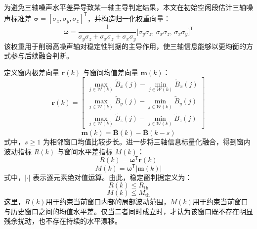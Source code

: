 \documentclass{xdupgthesis}
\begin{document}
为避免三轴噪声水平差异导致某一轴主导判定结果，本文在初始空闲段估计三轴噪声标准差 $\boldsymbol{\sigma}=[\sigma_x,\sigma_y,\sigma_z]^{\mathsf{T}}$，并构造归一化权重向量：
\begin{equation}
    \boldsymbol{\omega}=\frac{1}{\sigma_y\sigma_z+\sigma_x\sigma_z+\sigma_x\sigma_y}
    \big[\sigma_y\sigma_z,\,\sigma_x\sigma_z,\,\sigma_x\sigma_y\big]^{\mathsf{T}}
\end{equation}
该权重用于削弱高噪声轴对稳定性判据的主导作用，使三轴信息能够以更均衡的方式参与后续融合判断。

定义窗内极差向量 $\mathbf{r}(k)$ 与窗间均值差向量 $\mathbf{m}(k)$：
\begin{equation}
    \mathbf{r}(k)=\begin{bmatrix}
        \max\limits_{j\in\mathcal{W}(k)}\widetilde{B}_x(j)-\min\limits_{j\in\mathcal{W}(k)}\widetilde{B}_x(j)\\
        \max\limits_{j\in\mathcal{W}(k)}\widetilde{B}_y(j)-\min\limits_{j\in\mathcal{W}(k)}\widetilde{B}_y(j)\\
        \max\limits_{j\in\mathcal{W}(k)}\widetilde{B}_z(j)-\min\limits_{j\in\mathcal{W}(k)}\widetilde{B}_z(j)
    \end{bmatrix}
\end{equation}
\begin{equation}
    \mathbf{m}(k)=\overline{\mathbf{B}}(k)-\overline{\mathbf{B}}(k-s)
\end{equation}
式中，$s\ge 1$ 为相邻窗口均值比较步长。进一步将三轴信息标量化融合，得到窗内波动指标 $R(k)$ 与窗间水平差指标 $M(k)$：
\begin{equation}
    R(k)=\boldsymbol{\omega}^{\mathsf{T}}\mathbf{r}(k)
\end{equation}
\begin{equation}
    M(k)=\boldsymbol{\omega}^{\mathsf{T}}\left|\mathbf{m}(k)\right|
\end{equation}
式中，$|\cdot|$ 表示逐元素绝对值运算。由此，稳定窗判据定义为：
\begin{equation}
    R(k)\le R_{\mathrm{th}}
\end{equation}
\begin{equation}
    M(k)\le M_{\mathrm{th}}
\end{equation}
这里，$R(k)$用于约束当前窗口内部的局部波动范围，$M(k)$用于约束当前窗口与历史窗口之间的均值水平差。仅当二者同时成立时，才认为该窗口既不存在明显残余扰动，也不存在持续的水平漂移。
\end{document}
